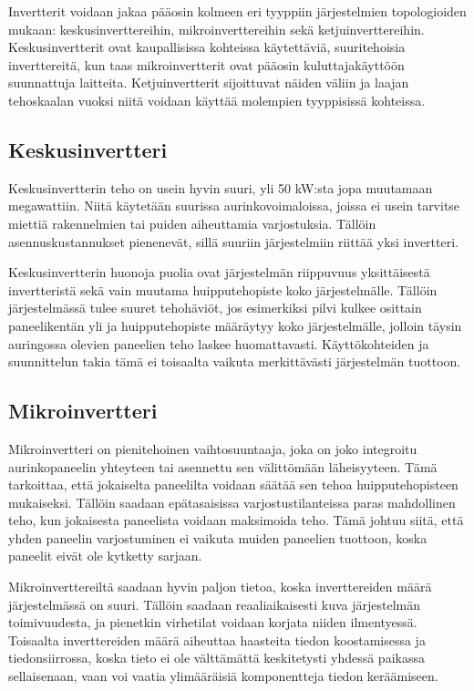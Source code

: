   Invertterit voidaan jakaa pääosin kolmeen eri tyyppiin järjestelmien topologioiden mukaan: keskusinverttereihin, mikroinverttereihin sekä ketjuinverttereihin. Keskusinvertterit ovat kaupallisissa kohteissa käytettäviä, suuritehoisia inverttereitä, kun taas mikroinvertterit ovat pääosin kuluttajakäyttöön suunnattuja laitteita. Ketjuinvertterit sijoittuvat näiden väliin ja laajan tehoskaalan vuoksi niitä voidaan käyttää molempien tyyppisissä kohteissa.

\subsection{Keskusinvertteri}
  Keskusinvertterin teho on usein hyvin suuri, yli 50 kW:sta jopa muutamaan megawattiin. Niitä käytetään suurissa aurinkovoimaloissa, joissa ei usein tarvitse miettiä rakennelmien tai puiden aiheuttamia varjostuksia. Tällöin asennuskustannukset pienenevät, sillä suuriin järjestelmiin riittää yksi invertteri.

  Keskusinvertterin huonoja puolia ovat järjestelmän riippuvuus yksittäisestä invertteristä sekä vain muutama huipputehopiste koko järjestelmälle. Tällöin järjestelmässä tulee suuret tehohäviöt, jos esimerkiksi pilvi kulkee osittain paneelikentän yli ja huipputehopiste määräytyy koko järjestelmälle, jolloin täysin auringossa olevien paneelien teho laskee huomattavasti. Käyttökohteiden ja suunnittelun takia tämä ei toisaalta vaikuta merkittävästi järjestelmän tuottoon.

\subsection{Mikroinvertteri}
  Mikroinvertteri on pienitehoinen vaihtosuuntaaja, joka on joko integroitu aurinkopaneelin yhteyteen tai asennettu sen välittömään läheisyyteen. Tämä tarkoittaa, että jokaiselta paneelilta voidaan säätää sen tehoa huipputehopisteen mukaiseksi. Tällöin saadaan epätasaisissa varjostustilanteissa paras mahdollinen teho, kun jokaisesta paneelista voidaan maksimoida teho. Tämä johtuu siitä, että yhden paneelin varjostuminen ei vaikuta muiden paneelien tuottoon, koska paneelit eivät ole kytketty sarjaan.

  Mikroinverttereiltä saadaan hyvin paljon tietoa, koska inverttereiden määrä järjestelmässä on suuri. Tällöin saadaan reaaliaikaisesti kuva järjestelmän toimivuudesta, ja pienetkin virhetilat voidaan korjata niiden ilmentyessä. Toisaalta inverttereiden määrä aiheuttaa haasteita tiedon koostamisessa ja tiedonsiirrossa, koska tieto ei ole välttämättä keskitetysti yhdessä paikassa sellaisenaan, vaan voi vaatia ylimääräisiä komponentteja tiedon keräämiseen.

